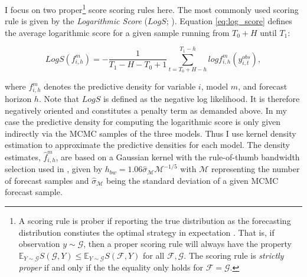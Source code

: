\documentclass[12pt,letterpaper,fleqn]{article}           %
\begin{document}
I focus on two proper\footnote{A scoring rule is prober if reporting the true distribution as the forecasting distribution constiutes the optimal strategy in expectation \parencite{gneiting14}. That is, if observation $y \sim \mathcal{G}$, then a proper scoring rule will always have the property $\mathds{E}_{Y \sim \mathcal{G}} S(\mathcal{G}, Y) \leq \mathds{E}_{Y \sim \mathcal{G}} S(\mathcal{F}, Y)$ for all $\mathcal{F}, \mathcal{G}$. The scoring rule is \textit{strictly proper} if and only if the the equality only holds for $\mathcal{F}=\mathcal{G}$.} score scoring rules here. The most commonly used scoring rule is given by the \textit{Logarithmic Score} ($LogS$; \cite{good52}). Equation \eqref{eq:log_score} defines the average logarithmic score for a given sample running from $T_0 + H$ until $T_1$:

\begin{equation}
LogS(f^m_{i,h}) = - \frac{1}{T_1 - H - T_0 + 1} \sum_{t = T_0 + H - h}^{T_1 - h} log f^m_{i,h}(y_{i,t}^{obs}),
\label{eq:log_score}
\end{equation}

where $f^m_{i,h}$ denotes the predictive density for variable $i$, model $m$, and forecast horizon $h$. Note that $LogS$ is defined as the negative log likelihood. It is therefore negatively oriented and constitutes a penalty term as demanded above.
In my case the predictive density for computing the logarithmic score is only given indirectly via the MCMC samples of the three models. Thus I use kernel density estimation to approximate the predictive densities for each model. The density estimates, $\hat{f}^m_{i,h}$, are based on a Gaussian kernel with the rule-of-thumb bandwidth selection used in \textcite{silverman86}, given by $h_{bw} = 1.06 \hat{\sigma}_{\mathcal{M}}\mathcal{M}^{-1/5}$ with $\mathcal{M}$ representing the number of forecast samples and $\hat{\sigma}_{\mathcal{M}}$ being the standard deviation of a given MCMC forecast sample.
\end{document}
